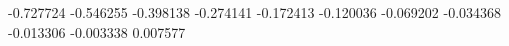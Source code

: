-0.727724
-0.546255
-0.398138
-0.274141
-0.172413
-0.120036
-0.069202
-0.034368
-0.013306
-0.003338
0.007577
